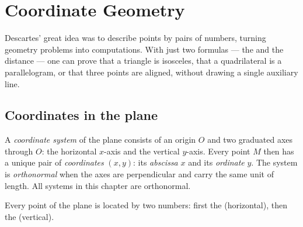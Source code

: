 \chapter{Coordinate Geometry}\label{ch:g10:coordgeom}

Descartes' great idea was to describe points by pairs of numbers, turning
geometry problems into computations. With just two formulas --- the
 and the distance --- one can prove that a triangle is isosceles,
that a quadrilateral is a parallelogram, or that three points are aligned,
without drawing a single auxiliary line.

\section{Coordinates in the plane}

\begin{definition}\label{def:g10:coordgeom:system}
A \emph{coordinate system} of the plane consists
of an origin $O$ and two graduated axes through $O$: the horizontal
$x$-axis and the vertical $y$-axis. Every point $M$ then has a unique pair
of \emph{coordinates} $(x, y)$: its
\emph{abscissa} $x$ and its
\emph{ordinate} $y$. The system is
\emph{orthonormal} when the axes are
perpendicular and carry the same unit of length. All systems in this
chapter are orthonormal.
\end{definition}

\begin{omfigure}

{\small Every point of the plane is located by two numbers: first the
 (horizontal), then the  (vertical).}
\end{omfigure}

